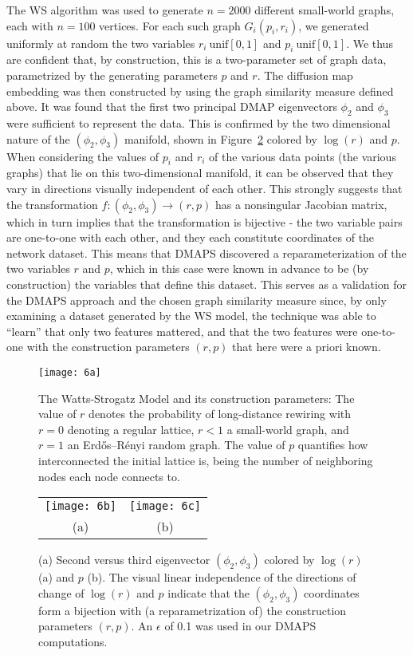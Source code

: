 The WS algorithm was used to generate $n=2000$ different small-world
graphs, each with $n=100$ vertices. For each such graph
$G_i(p_i, r_i)$, we generated uniformly at random the two variables
$r_i ~ \mathrm{unif}[0,1]$ and $p_i ~ \mathrm{unif}[0,1]$. We thus are
confident that, by construction, this is a two-parameter set of graph
data, parametrized by the generating parameters $p$ and $r$. The
diffusion map embedding was then constructed by using the graph
similarity measure defined above. It was found that the first two
principal DMAP eigenvectors $\phi_2$ and $\phi_3$ were sufficient to
represent the data. This is confirmed by the two dimensional nature of
the $(\phi_2, \phi_3)$ manifold, shown in Figure~\ref{fig:sis6bc}
colored by $\log(r)$ and $p$. When considering the values of $p_i$ and
$r_i$ of the various data points (the various graphs) that lie on this
two-dimensional manifold, it can be observed that they vary in
directions visually independent of each other. This strongly suggests
that the transformation $f:(\phi_2, \phi_3) \rightarrow (r,p)$ has a
nonsingular Jacobian matrix, which in turn implies that the
transformation is bijective - the two variable pairs are one-to-one
with each other, and they each constitute coordinates of the network
dataset. This means that DMAPS discovered a reparameterization of the
two variables $r$ and $p$, which in this case were known in advance to
be (by construction) the variables that define this dataset. This
serves as a validation for the DMAPS approach and the chosen graph
similarity measure since, by only examining a dataset generated by the
WS model, the technique was able to “learn” that only two features
mattered, and that the two features were one-to-one with the
construction parameters $(r, p)$ that here were a priori known.


\begin{figure}[!htp]
\centering
\texttt{[image: 6a]}
\caption{The Watts-Strogatz Model and its construction parameters:
  The value of $r$ denotes the probability of long-distance rewiring
  with $r = 0$ denoting a regular lattice, $r < 1$ a small-world graph,
  and $r = 1$ an Erdős–Rényi random graph. The value of $p$ quantifies how
  interconnected the initial lattice is, being the number of
  neighboring nodes each node connects to. \label{fig:sis6a}}
\end{figure}

\begin{figure}[!htp]
\centering
\begin{tabular}{cc}
  \texttt{[image: 6b]} &
  \texttt{[image: 6c]}\\
  (a) & (b)
\end{tabular}
\caption{(a) Second versus third eigenvector $(\phi_2 ,\phi_3)$
  colored by $\log(r)$ (a) and $p$ (b). The visual linear independence
  of the directions of change of $\log(r)$ and $p$ indicate that the
  $(\phi_2 ,\phi_3)$ coordinates form a bijection with (a
  reparametrization of) the construction parameters $(r, p)$. An
  $\epsilon$ of 0.1 was used in our DMAPS
  computations. \label{fig:sis6bc}}
\end{figure}


